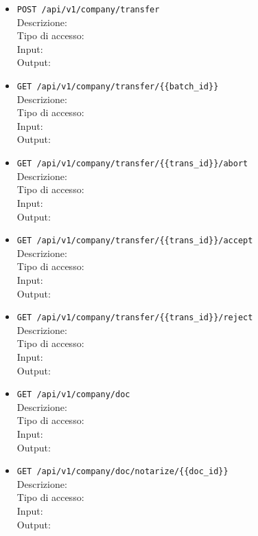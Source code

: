 \documentclass[a4paper,11pt]{article}
\begin{document}
\begin{itemize}
  \item \texttt{POST /api/v1/company/transfer}
    \\ Descrizione:
    \\ Tipo di accesso:
    \\ Input:
    \\ Output:

  \item \texttt{GET /api/v1/company/transfer/\{\{batch\_id\}\}}
    \\ Descrizione:
    \\ Tipo di accesso:
    \\ Input:
    \\ Output:

  \item \texttt{GET /api/v1/company/transfer/\{\{trans\_id\}\}/abort}
    \\ Descrizione:
    \\ Tipo di accesso:
    \\ Input:
    \\ Output:

  \item \texttt{GET /api/v1/company/transfer/\{\{trans\_id\}\}/accept}
    \\ Descrizione:
    \\ Tipo di accesso:
    \\ Input:
    \\ Output:

  \item \texttt{GET /api/v1/company/transfer/\{\{trans\_id\}\}/reject}
    \\ Descrizione:
    \\ Tipo di accesso:
    \\ Input:
    \\ Output:

  \item \texttt{GET /api/v1/company/doc}
    \\ Descrizione:
    \\ Tipo di accesso:
    \\ Input:
    \\ Output:

  \item \texttt{GET /api/v1/company/doc/notarize/\{\{doc\_id\}\}}
    \\ Descrizione:
    \\ Tipo di accesso:
    \\ Input:
    \\ Output:


\end{itemize}
\end{document}

